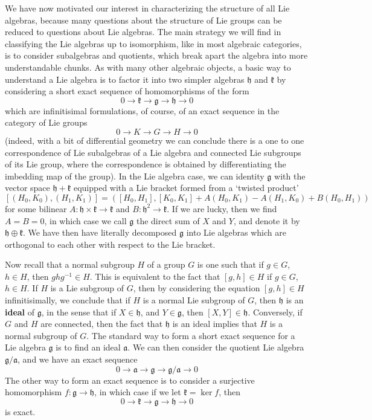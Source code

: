 We have now motivated  our interest in characterizing the structure of all Lie algebras, because many questions about the structure of Lie groups can be reduced to questions about Lie algebras. The main strategy we will find in classifying the Lie algebras up to isomorphism, like in most algebraic categories, is to consider subalgebras and quotients, which break apart the algebra into more understandable chunks. As with many other algebraic objects, a basic way to understand a Lie algebra is to factor it into two simpler algebras $\mathfrak{h}$ and $\mathfrak{k}$ by considering a short exact sequence of homomorphisms of the form
%
\[ 0 \to \mathfrak{k} \to \mathfrak{g} \to \mathfrak{h} \to 0 \]
%
which are infinitisimal formulations, of course, of an exact sequence in the category of Lie groups
%
\[ 0 \to K \to G \to H \to 0 \]
%
(indeed, with a bit of differential geometry we can conclude there is a one to one correspondence of Lie subalgebras of a Lie algebra and connected Lie subgroups of its Lie group, where the correspondence is obtained by differentiating the imbedding map of the group). In the Lie algebra case, we can identity $\mathfrak{g}$ with the vector space $\mathfrak{h} + \mathfrak{k}$ equipped with a Lie bracket formed from a `twisted product'
%
\[ [(H_0,K_0), (H_1,K_1)] = \left([H_0,H_1], [K_0,K_1] + A(H_0,K_1) - A(H_1,K_0) + B(H_0,H_1) \right) \]
%
for some bilinear $A: \mathfrak{h} \times \mathfrak{k} \to \mathfrak{k}$ and $B: \mathfrak{h}^2 \to \mathfrak{k}$. If we are lucky, then we find $A = B = 0$, in which case we call $\mathfrak{g}$ the direct sum of $X$ and $Y$, and denote it by $\mathfrak{h} \oplus \mathfrak{k}$. We have then have literally decomposed $\mathfrak{g}$ into Lie algebras which are orthogonal to each other with respect to the Lie bracket.

Now recall that a normal subgroup $H$ of a group $G$ is one such that if $g \in G$, $h \in H$, then $ghg^{-1} \in H$. This is equivalent to the fact that $[g,h] \in H$ if $g \in G$, $h \in H$. If $H$ is a Lie subgroup of $G$, then by considering the equation $[g,h] \in H$ infinitisimally, we conclude that if $H$ is a normal Lie subgroup of $G$, then $\mathfrak{h}$ is an {\bf ideal} of $\mathfrak{g}$, in the sense that if $X \in \mathfrak{h}$, and $Y \in \mathfrak{g}$, then $[X,Y] \in \mathfrak{h}$. Conversely, if $G$ and $H$ are connected, then the fact that $\mathfrak{h}$ is an ideal implies that $H$ is a normal subgroup of $G$. The standard way to form a short exact sequence for a Lie algebra $\mathfrak{g}$ is to find an ideal $\mathfrak{a}$. We can then consider the quotient Lie algebra $\mathfrak{g}/\mathfrak{a}$, and we have an exact sequence
%
\[ 0 \to \mathfrak{a} \to \mathfrak{g} \to \mathfrak{g}/\mathfrak{a} \to 0 \]
%
The other way to form an exact sequence is to consider a surjective homomorphism $f: \mathfrak{g} \to \mathfrak{h}$, in which case if we let $\mathfrak{k} = \ker f$, then
%
\[ 0 \to \mathfrak{k} \to \mathfrak{g} \to \mathfrak{h} \to 0 \]
%
is exact.

